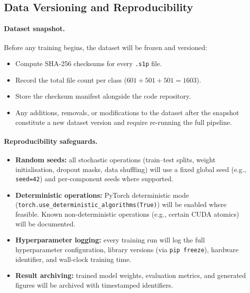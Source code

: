 \subsection{Data Versioning and Reproducibility}
\label{subsec:reproducibility}

\paragraph{Dataset snapshot.}
Before any training begins, the dataset will be frozen and versioned:
%
\begin{itemize}
  \item Compute SHA-256 checksums for every \texttt{.s1p} file.
  \item Record the total file count per class
        ($601 + 501 + 501 = 1603$).
  \item Store the checksum manifest alongside the code repository.
  \item Any additions, removals, or modifications to the dataset
        after the snapshot constitute a new dataset version and
        require re-running the full pipeline.
\end{itemize}

\paragraph{Reproducibility safeguards.}
\begin{itemize}
  \item \textbf{Random seeds:} all stochastic operations (train--test
        splits, weight initialisation, dropout masks, data shuffling)
        will use a fixed global seed (e.g., \texttt{seed=42}) and
        per-component seeds where supported.
  \item \textbf{Deterministic operations:} PyTorch deterministic mode
        (\texttt{torch.use\_deterministic\_algorithms(True)}) will be
        enabled where feasible.  Known non-deterministic operations
        (e.g., certain CUDA atomics) will be documented.
  \item \textbf{Hyperparameter logging:} every training run will log
        the full hyperparameter configuration, library versions
        (via \texttt{pip freeze}), hardware identifier, and wall-clock
        training time.
  \item \textbf{Result archiving:} trained model weights, evaluation
        metrics, and generated figures will be archived with
        timestamped identifiers.
\end{itemize}


